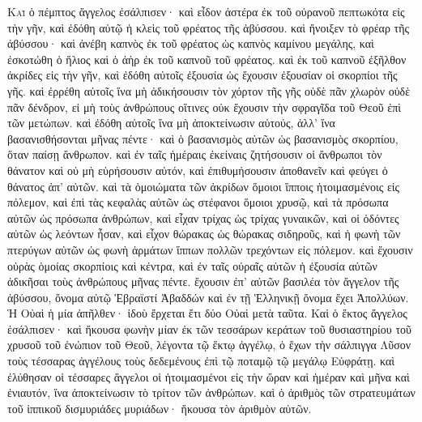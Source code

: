 \begin{pages}
    \begin{Rightside}
        \beginnumbering
		\renewcommand{\LettrineFontHook}{\PHtitl}
		\lettrine[lines=3]{Κ}{αὶ} ὁ πέμπτος ἄγγελος ἐσάλπισεν· καὶ εἶδον ἀστέρα ἐκ τοῦ οὐρανοῦ πεπτωκότα εἰς τὴν γῆν, καὶ ἐδόθη αὐτῷ ἡ κλεὶς τοῦ φρέατος τῆς ἀβύσσου. καὶ ἤνοιξεν τὸ φρέαρ τῆς ἀβύσσου· καὶ ἀνέβη καπνὸς ἐκ τοῦ φρέατος ὡς καπνὸς καμίνου μεγάλης, καὶ ἐσκοτώθη ὁ ἥλιος καὶ ὁ ἀὴρ ἐκ τοῦ καπνοῦ τοῦ φρέατος. 
		\pend
		\pstart
		καὶ ἐκ τοῦ καπνοῦ ἐξῆλθον ἀκρίδες εἰς τὴν γῆν, καὶ ἐδόθη αὐτοῖς ἐξουσία ὡς ἔχουσιν ἐξουσίαν οἱ σκορπίοι τῆς γῆς. καὶ ἐρρέθη αὐτοῖς ἵνα μὴ ἀδικήσουσιν τὸν χόρτον τῆς γῆς οὐδὲ πᾶν χλωρὸν οὐδὲ πᾶν δένδρον, εἰ μὴ τοὺς ἀνθρώπους οἵτινες οὐκ ἔχουσιν τὴν σφραγῖδα τοῦ Θεοῦ ἐπὶ τῶν μετώπων. 
		\pend
		\pstart
		καὶ ἐδόθη αὐτοῖς ἵνα μὴ ἀποκτείνωσιν αὐτούς, ἀλλ’ ἵνα βασανισθήσονται μῆνας πέντε· καὶ ὁ βασανισμὸς αὐτῶν ὡς βασανισμὸς σκορπίου, ὅταν παίσῃ ἄνθρωπον. καὶ ἐν ταῖς ἡμέραις ἐκείναις ζητήσουσιν οἱ ἄνθρωποι τὸν θάνατον καὶ οὐ μὴ εὑρήσουσιν αὐτόν, καὶ ἐπιθυμήσουσιν ἀποθανεῖν καὶ φεύγει ὁ θάνατος ἀπ’ αὐτῶν. 
		\pend
		\pstart
		καὶ τὰ ὁμοιώματα τῶν ἀκρίδων ὅμοιοι ἵπποις ἡτοιμασμένοις εἰς πόλεμον, καὶ ἐπὶ τὰς κεφαλὰς αὐτῶν ὡς στέφανοι ὅμοιοι χρυσῷ, καὶ τὰ πρόσωπα αὐτῶν ὡς πρόσωπα ἀνθρώπων, καὶ εἶχαν τρίχας ὡς τρίχας γυναικῶν, καὶ οἱ ὀδόντες αὐτῶν ὡς λεόντων ἦσαν, καὶ εἶχον θώρακας ὡς θώρακας σιδηροῦς, καὶ ἡ φωνὴ τῶν πτερύγων αὐτῶν ὡς φωνὴ ἁρμάτων ἵππων πολλῶν τρεχόντων εἰς πόλεμον. 
		\pend
		\pstart
		καὶ ἔχουσιν οὐρὰς ὁμοίας σκορπίοις καὶ κέντρα, καὶ ἐν ταῖς οὐραῖς αὐτῶν ἡ ἐξουσία αὐτῶν ἀδικῆσαι τοὺς ἀνθρώπους μῆνας πέντε. ἔχουσιν ἐπ’ αὐτῶν βασιλέα τὸν ἄγγελον τῆς ἀβύσσου, ὄνομα αὐτῷ Ἑβραϊστί Ἀβαδδών καὶ ἐν τῇ Ἑλληνικῇ ὄνομα ἔχει Ἀπολλύων. Ἡ Οὐαὶ ἡ μία ἀπῆλθεν· ἰδοὺ ἔρχεται ἔτι δύο Οὐαὶ μετὰ ταῦτα.
		\pend
		\pstart
		Καὶ ὁ ἕκτος ἄγγελος ἐσάλπισεν· καὶ ἤκουσα φωνὴν μίαν ἐκ τῶν τεσσάρων κεράτων τοῦ θυσιαστηρίου τοῦ χρυσοῦ τοῦ ἐνώπιον τοῦ Θεοῦ, λέγοντα τῷ ἕκτῳ ἀγγέλῳ, ὁ ἔχων τὴν σάλπιγγα Λῦσον τοὺς τέσσαρας ἀγγέλους τοὺς δεδεμένους ἐπὶ τῷ ποταμῷ τῷ μεγάλῳ Εὐφράτῃ. καὶ ἐλύθησαν οἱ τέσσαρες ἄγγελοι οἱ ἡτοιμασμένοι εἰς τὴν ὥραν καὶ ἡμέραν καὶ μῆνα καὶ ἐνιαυτόν, ἵνα ἀποκτείνωσιν τὸ τρίτον τῶν ἀνθρώπων. καὶ ὁ ἀριθμὸς τῶν στρατευμάτων τοῦ ἱππικοῦ δισμυριάδες μυριάδων· ἤκουσα τὸν ἀριθμὸν αὐτῶν. 

\end{Rightside}
\end{pages}
